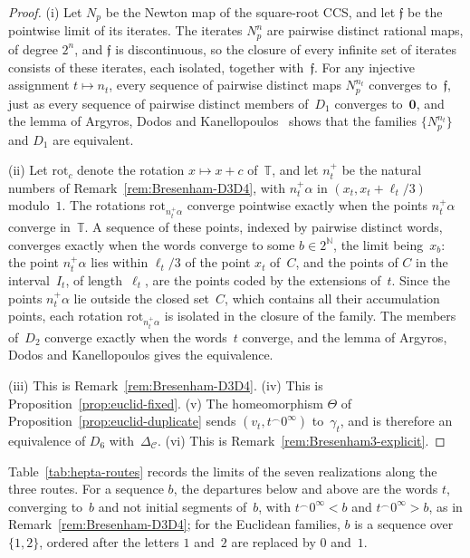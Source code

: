 \documentclass[psamsfonts]{amsart}
\theoremstyle{definition}
\theoremstyle{remark}
\numberwithin{equation}{section}
\begin{document}
\begin{proof}
  (i) Let $N_p$ be the Newton map of the square-root CCS, and let $\mathfrak{f}$ be the pointwise limit of its iterates.
  The iterates $N_p^n$ are pairwise distinct rational maps, of degree $2^n$, and $\mathfrak{f}$ is discontinuous, so the closure of every infinite set of iterates consists of these iterates, each isolated, together with~$\mathfrak{f}$.
  For any injective assignment $t\mapsto n_t$, every sequence of pairwise distinct maps $N_p^{n_t}$ converges to~$\mathfrak{f}$, just as every sequence of pairwise distinct members of~$D_1$ converges to~$\mathbf{0}$, and the lemma of Argyros, Dodos and Kanellopoulos~\cite[Lemma~19]{argyros2008rosenthal} shows that the families $\{N_p^{n_t}\}$ and $D_1$ are equivalent.

  (ii) Let $\mathrm{rot}_c$ denote the rotation $x\mapsto x+c$ of~$\mathbb{T}$, and let $n_t^+$ be the natural numbers of Remark~\ref{rem:Bresenham-D3D4}, with $n_t^+\alpha$ in $(x_t,x_t+\ell_t/3)$ modulo~$1$.
  The rotations $\mathrm{rot}_{n_t^+\alpha}$ converge pointwise exactly when the points $n_t^+\alpha$ converge in~$\mathbb{T}$.
A sequence of these points, indexed by pairwise distinct words, converges exactly when the words converge to some $b\in2^{\mathbb{N}}$, the limit being~$x_b$: the point $n_t^+\alpha$ lies within $\ell_t/3$ of the point $x_t$ of~$C$, and the points of $C$ in the interval~$I_t$, of length~$\ell_t$, are the points coded by the extensions of~$t$.
  Since the points $n_t^+\alpha$ lie outside the closed set~$C$, which contains all their accumulation points, each rotation $\mathrm{rot}_{n_t^+\alpha}$ is isolated in the closure of the family.
  The members of~$D_2$ converge exactly when the words~$t$ converge, and the lemma of Argyros, Dodos and Kanellopoulos gives the equivalence.

  (iii) This is Remark~\ref{rem:Bresenham-D3D4}.
  (iv) This is Proposition~\ref{prop:euclid-fixed}.
  (v) The homeomorphism $\Theta$ of Proposition~\ref{prop:euclid-duplicate} sends $(v_t,t^\frown0^\infty)$ to~$\gamma_t$, and is therefore an equivalence of $D_6$ with~$\Delta_{\mathcal{C}}$.
  (vi) This is Remark~\ref{rem:Bresenham3-explicit}.
\end{proof}

Table~\ref{tab:hepta-routes} records the limits of the seven realizations along the three routes.
For a sequence $b$, the departures below and above are the words $t$, converging to~$b$ and not initial segments of~$b$, with $t^\frown0^\infty<b$ and $t^\frown0^\infty>b$, as in Remark~\ref{rem:Bresenham-D3D4}; for the Euclidean families, $b$ is a sequence over $\{1,2\}$, ordered after the letters $1$ and~$2$ are replaced by $0$ and~$1$.
\end{document}
